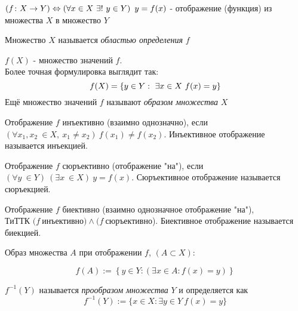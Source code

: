 \begin{definition}
    $(f \colon X \ra Y) \lra \left(\forall x \in X\ \exists! \ 
    y \in Y\right)\ y = f(x)$ - отображение
    (функция) из множества $X$ в множество $Y$
\end{definition}

\begin{definition}
    Множество $X$ называется \textit{областью определения} $f$
\end{definition}

\begin{definition}
    $f(X)$ - множество значений $f$.\\ Более точная формулировка выглядит так:
    $$
    f(X) = \{y \in Y :\  \exists x \in X\ f(x) = y\}
    $$
    Ещё множество значений $f$ называют \textit{образом множества} $X$
\end{definition}

\begin{definition}
    Отображение $f$ инъективно (взаимно однозначно), если \\ $(\forall x_1, x_2 \ 
    \in X,\  x_1 \neq x_2)\  f(x_1) \neq f(x_2)$.  Инъективное отображение называется инъекцией.
\end{definition}

\begin{definition}
    Отображение $f$ сюръективно (отображение "на"), если \\ $(\forall y \ 
    \in Y)\ (\exists x \ \in X)\  y = f(x)$. Сюръективное отображение называется сюръекцией.
\end{definition}

\begin{definition}
    Отображение $f$ биективно (взаимно однозначное отображение "на"),\\ ТиТТК 
    $(f\  $инъективно$) \wedge (f\ $сюръективно). Биективное отображение называется биекцией.
\end{definition}

\begin{definition}
    Образ множества $A$ при отображении $f$, $(A \subset X):$ 
    
     \[ f(A) :=  \left\{y \in  Y : \left(\exists x \in A : f(x) = y\right) \right\}\]
\end{definition}

\begin{definition}
    $f^{-1}(Y)$ называется \textit{прообразом множества} $Y$ и определяется как
    $$
        f^{-1}(Y) := \{x \in X : \exists y \in Y\ f(x) = y\}
    $$
\end{definition}

